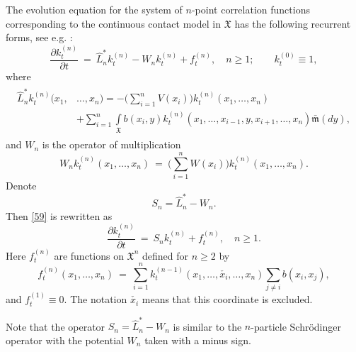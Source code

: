 \documentclass[a4paper,12pt]{article}
\newcommand{\XXX}{{\mathfrak{X}}}
\begin{document}
The evolution equation for the system of $n$-point correlation functions corresponding to the continuous contact model in $\XXX$ has the following recurrent forms, see e.g. \cite{KKP, PZ-EJP}:
\begin{equation}\label{59}
\frac{\partial k_{t}^{(n)}}{\partial t} \ = \ \hat L_n^{\ast} k_{t}^{(n)} - W_n k_{t}^{(n)}
+  f_{t}^{(n)}, \quad n\ge 1; \qquad k_{t}^{(0)} \equiv 1,
\end{equation}
where
\begin{align}
 \begin{aligned}\label{korf}
 \hat L^{\ast}_n k_t^{(n)}(x_1, &\ldots, x_n)  =  - \Big( \sum_{i=1}^n  V(x_i) \Big) k_t^{(n)}(x_1,
\ldots, x_n) \\
& + \sum_{i=1}^n \int\limits_{\XXX} b(x_i, y) k_t^{(n)}(x_1, \ldots, x_{i-1}, y,
x_{i+1}, \ldots, x_n) \bar{\mathfrak{m}}(dy),
\end{aligned}
\end{align}
and $W_n$ is the operator of multiplication
\begin{equation}\label{W-1}
W_n k_{t}^{(n)} (x_1, \ldots, x_n) \ = \  \Big( \sum_{i=1}^n  W(x_i) \Big)  k_t^{(n)}(x_1,
\ldots, x_n).
\end{equation}
Denote
\begin{equation}\label{Sn}
S_n =  \hat L_n^{\ast} - W_n.
\end{equation}
Then \eqref{59} is rewritten as
 \begin{equation}\label{59W}
\frac{\partial k_{t}^{(n)}}{\partial t} \ = \ S_n k_{t}^{(n)}
+  f_{t}^{(n)}, \quad n\ge 1.
\end{equation}
Here $f_{t}^{(n)}$ are functions on $\XXX^{n}$ defined for $n \ge 2$ by
\begin{equation}\label{f}
f_{t}^{(n)}(x_1, \ldots, x_n) \ = \ \sum_{i=1}^n  k_{t}^{(n-1)}(x_1,
\ldots,\check{x_i}, \ldots, x_n) \sum_{j\neq i} b(x_i, x_j),
\end{equation}
and  $f_{t}^{(1)} \equiv 0$. The notation $\check{x_i}$ means that this coordinate is excluded.

Note that the operator $S_n = \hat L_n^{\ast} - W_n$ is similar to the $n$-particle Schr\"{o}dinger operator with the potential $W_n$ taken with a minus sign.
\end{document}

